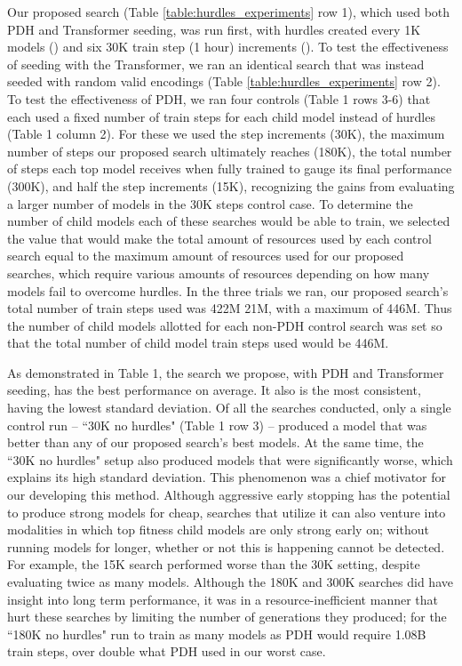 \documentclass{article}
\begin{document}
Our proposed search (Table \ref{table:hurdles_experiments} row 1), which used both PDH and Transformer seeding, was run first, with hurdles created every 1K models () and six 30K train step (1 hour) increments (). To test the effectiveness of seeding with the Transformer, we ran an identical search that was instead seeded with random valid encodings (Table \ref{table:hurdles_experiments} row 2). To test the effectiveness of PDH, we ran four controls (Table 1 rows 3-6) that each used a fixed number of train steps for each child model instead of hurdles (Table 1 column 2). For these we used the step increments (30K), the maximum number of steps our proposed search ultimately reaches (180K), the total number of steps each top model receives when fully trained to gauge its final performance (300K), and half the step increments (15K), recognizing the gains from evaluating a larger number of models in the 30K steps control case. To determine the number of child models each of these searches would be able to train, we selected the value that would make the total amount of resources used by each control search equal to the maximum amount of resources used for our proposed searches, which require various amounts of resources depending on how many models fail to overcome hurdles. In the three trials we ran, our proposed search's total number of train steps used was 422M  21M, with a maximum of 446M. Thus the number of child models allotted for each non-PDH control search was set so that the total number of child model train steps used would be 446M.

As demonstrated in Table 1, the search we propose, with PDH and Transformer seeding, has the best performance on average. It also is the most consistent, having the lowest standard deviation. Of all the searches conducted, only a single control run -- ``30K no hurdles" (Table 1 row 3) -- produced a model that was better than any of our proposed search's best models. At the same time, the ``30K no hurdles" setup also produced models that were significantly worse, which explains its high standard deviation. This phenomenon was a chief motivator for our developing this method. Although aggressive early stopping has the potential to produce strong models for cheap, searches that utilize it can also venture into modalities in which top fitness child models are only strong early on; without running models for longer, whether or not this is happening cannot be detected. For example, the 15K search performed worse than the 30K setting, despite evaluating twice as many models. Although the 180K and 300K searches did have insight into long term performance, it was in a resource-inefficient manner that hurt these searches by limiting the number of generations they produced; for the ``180K no hurdles" run to train as many models as PDH would require 1.08B train steps, over double what PDH used in our worst case.
\end{document}
